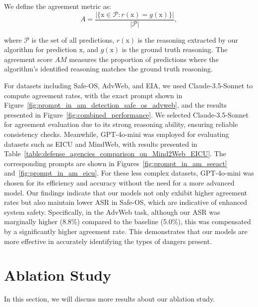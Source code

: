 We define the agreement metric as:
\begin{equation}
    A = \frac{|\{\text{x} \in \mathcal{P} : r(\text{x}) = g(\text{x})\}|}{|\mathcal{P}|},
    \label{eq:agreement}
\end{equation}

\noindent where $\mathcal{P}$ is the set of all predictions, $r(\text{x})$ is the reasoning extracted by our algorithm for prediction $\text{x}$, and $g(\text{x})$ is the ground truth reasoning. The agreement score $AM$ measures the proportion of predictions where the algorithm's identified reasoning matches the ground truth reasoning. %





For datasets including Safe-OS, AdvWeb, and EIA, we used Claude-3.5-Sonnet to compute agreement rates, with the exact prompt shown in Figure~\ref{fig:prompt_in_am_detection_safe_os_advweb}, and the results presented in Figure~\ref{fig:combined_performance}. We selected Claude-3.5-Sonnet for agreement evaluation due to its strong reasoning ability, ensuring reliable consistency checks. Meanwhile, GPT-4o-mini was employed for evaluating datasets such as EICU and MindWeb, with results presented in Table~\ref{table:defense_agencies_comparison_on_Mind2Web_EICU}. The corresponding prompts are shown in Figures~\ref{fig:prompt_in_am_seeact} and~\ref{fig:prompt_in_am_eicu}. For these less complex datasets, GPT-4o-mini was chosen for its efficiency and accuracy without the need for a more advanced model. Our findings indicate that our models not only exhibit higher agreement rates but also maintain lower ASR in Safe-OS, which are indicative of enhanced system safety. Specifically, in the AdvWeb task, although our ASR was marginally higher (8.8\%) compared to the baseline (5.0\%), this was compensated by a significantly higher agreement rate. This demonstrates that our models are more effective in accurately identifying the types of dangers present.



\section{Ablation Study}
In this section, we will discuss more results about our ablation study.
\label{appendix:ablation_study}
